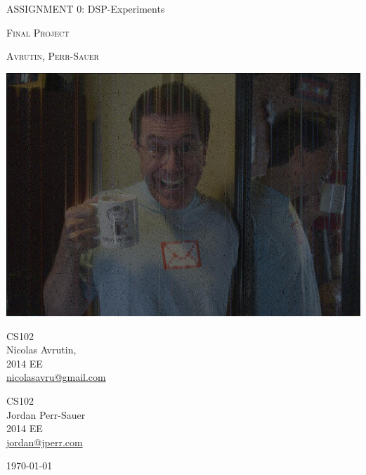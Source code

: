 \documentclass[12pt,letterpaper]{article}
\begin{document}
\begin{titlepage}

\begin{center}

{\LARGE ASSIGNMENT 0: DSP-Experiments}
\vspace{.5 cm}

\textsc{\Large Final Project}
\vspace{1 cm}

\textsc{\Huge Avrutin, Perr-Sauer}
\vspace{.5 cm}

\includegraphics[scale=0.35]{./reddit.jpg}

\end{center}
\vfill

\begin{flushright}
\begin{large}
CS102 \\
Nicolas Avrutin, \\
2014 EE \\
\url{nicolasavru@gmail.com} \\
\vspace{.5 cm}

CS102 \\
Jordan Perr-Sauer \\
2014 EE \\
\url{jordan@jperr.com}
\vspace{.5 in}

\today

\end{large}
\end{flushright}
\end{titlepage}
\end{document}
